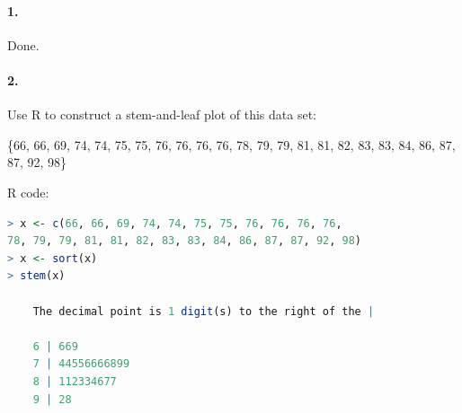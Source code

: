 

\graphicspath{ {./images/} }

\renewcommand\classname{STAT F300 Statistics, Dr. Short}

\renewcommand\assignment{Homework 2, Due Friday, January 27, 23:59}

    \paragraph*{1.}
    \begin{mdframed}
        Done.
    \end{mdframed}

    \paragraph*{2.}
    Use R to construct a stem-and-leaf plot of this data set:

    \{66, 66, 69, 74, 74, 75, 75, 76, 76, 76, 76, 78, 79, 79, 81, 81, 82, 83, 83, 84, 86, 87, 87, 92, 98\}

    \begin{mdframed}
        R code:
        \begin{lstlisting}[language=R]
> x <- c(66, 66, 69, 74, 74, 75, 75, 76, 76, 76, 76, 
78, 79, 79, 81, 81, 82, 83, 83, 84, 86, 87, 87, 92, 98)
> x <- sort(x)
> stem(x)

    The decimal point is 1 digit(s) to the right of the |

    6 | 669
    7 | 44556666899
    8 | 112334677
    9 | 28
        \end{lstlisting}
    \end{mdframed}

